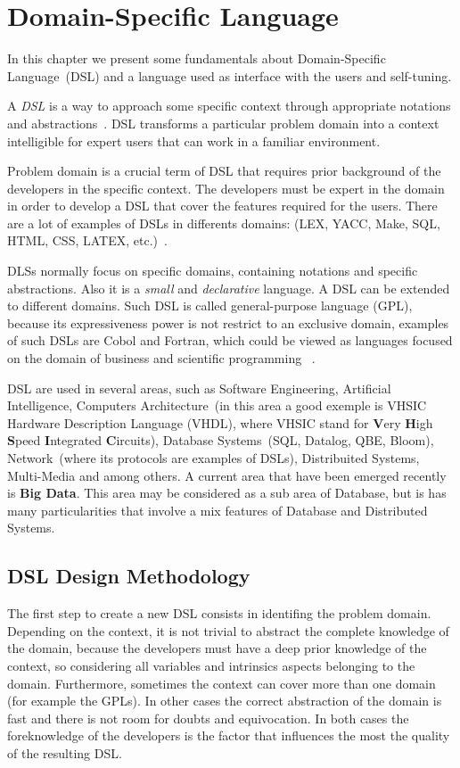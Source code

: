 \chapter{Domain-Specific Language} %
\label{cha:dsl}

In this chapter we present some fundamentals about Domain-Specific Language~(DSL) and
a language used as interface with the users and self-tuning.

A \textit{DSL} is a way to approach some specific
context through appropriate notations and abstractions~\cite{deursen:2000}. DSL
transforms a particular problem domain into a context intelligible for expert
users that can work in a familiar environment.

Problem domain is a crucial term of DSL that requires prior background of the
developers in the specific context. The developers must be expert in the domain
in order to develop a DSL that cover the features required for the users. There are
a lot of examples of DSLs in differents domains: (LEX, YACC, Make, SQL,
HTML, CSS, LATEX, etc.)~\cite{bentley:1986}.

DLSs normally focus on specific domains, containing notations and specific abstractions.
Also it is a \textit{small} and \textit{declarative} language. A
DSL can be extended to different domains. Such DSL is called general-purpose
language (GPL), because its expressiveness power is not restrict to
an exclusive domain, examples of such DSLs are Cobol and Fortran, which
could be viewed as languages focused on the domain of business and scientific
programming  ~\cite{deursen:2000}.

DSL are used in several areas, such as Software Engineering, 
Artificial Intelligence, Computers Architecture~(in this area a
good exemple is VHSIC Hardware Description Language (VHDL), where VHSIC stand for 
{\bf V}ery {\bf H}igh {\bf S}peed {\bf I}ntegrated {\bf C}ircuits), Database
Systems~(SQL, Datalog, QBE, Bloom), Network~(where its
protocols are examples of DSLs), Distribuited Systems, Multi-Media
and among others. A current area that have been emerged recently is \textbf{Big Data}.
This area may be considered as a sub area of Database, but is has many
particularities that involve a mix features of Database and Distributed Systems.

\section{DSL Design Methodology}

The first step to create a new DSL consists in identifing the problem domain. Depending on
the context, it is not trivial to abstract the complete knowledge of the domain, because
the developers must have a deep prior knowledge of the context, so considering all
variables and intrinsics aspects belonging to the domain. Furthermore, sometimes
the context can cover more than one domain (for example the GPLs). In other cases
the correct abstraction of the domain is fast and there is not room for doubts
and equivocation. In both cases the foreknowledge of the developers is the factor
that influences the most the quality of the resulting DSL.


